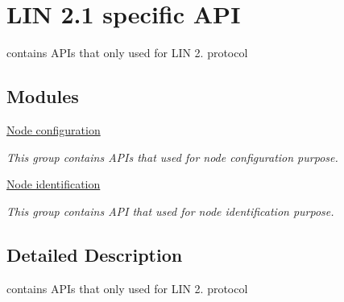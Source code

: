 \hypertarget{group__lin21tl__api__group}{}\section{L\+I\+N 2.1 specific A\+P\+I}
\label{group__lin21tl__api__group}


contains A\+P\+Is that only used for L\+I\+N 2. protocol  


\subsection*{Modules}
\begin{DoxyCompactItemize}
\item 
\hyperlink{group__node__configuration__group}{Node configuration}
\begin{DoxyCompactList}\small\item\em This group contains A\+P\+Is that used for node configuration purpose. \end{DoxyCompactList}\item 
\hyperlink{group__node__identification__group}{Node identification}
\begin{DoxyCompactList}\small\item\em This group contains A\+P\+I that used for node identification purpose. \end{DoxyCompactList}\end{DoxyCompactItemize}


\subsection{Detailed Description}
contains A\+P\+Is that only used for L\+I\+N 2. protocol 


